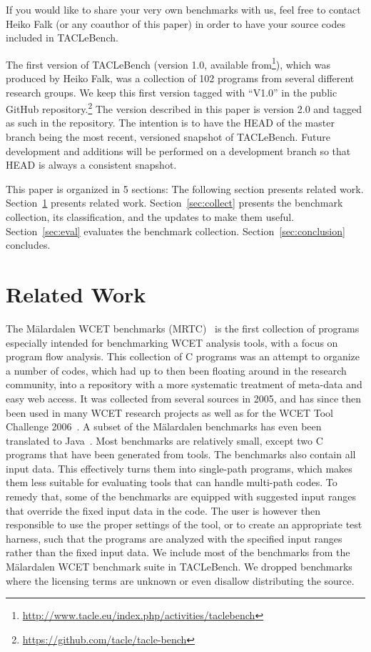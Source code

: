 \documentclass[a4paper,UKenglish]{oasics}
\begin{document}
If you would like to share your very own benchmarks with us,
feel free to contact Heiko Falk (or any coauthor of this paper) in order
to have your source codes included in TACLeBench.

The first version of TACLeBench (version 1.0, available
from\footnote{\url{http://www.tacle.eu/index.php/activities/taclebench}}), which was produced
by Heiko Falk, was a collection of 102 programs from several different
research groups. We keep this first version tagged with ``V1.0'' in the public
GitHub repository.\footnote{\url{https://github.com/tacle/tacle-bench}}
The version described in this paper is version 2.0 and tagged as such in the
repository.
The intention is to have the HEAD of the master branch being
the most recent, versioned snapshot of TACLeBench.
Future development and additions will be performed on a development
branch so that HEAD is always a consistent snapshot.

This paper is organized in 5 sections: The following section presents related work.
Section~\ref{sec:related} presents related work.
Section~\ref{sec:collect} presents the benchmark collection, its classification, and the updates
to make them useful.
Section~\ref{sec:eval} evaluates the benchmark collection.
Section~\ref{sec:conclusion} concludes.

\section{Related Work}
\label{sec:related}

The M{\"a}lardalen WCET benchmarks (MRTC)~\cite{wcet:bench:2012} is the first collection of programs especially
intended for benchmarking WCET analysis tools, with a focus on program flow analysis.
This collection of C programs was an attempt to organize a number of codes, which had up to then been floating around
in the research community, into a repository with a more systematic treatment of meta-data and easy web access.
It was collected from several sources in 2005, and has since then been
used in many WCET research projects as well as for the WCET Tool Challenge 2006~\cite{Gustafsson:ISOLA2006}.
A subset of the M{\"a}lardalen benchmarks has even been translated to
Java~\cite{jop:volta:rtas2008}. Most benchmarks are relatively small, except
two C programs that have been generated from tools.
The benchmarks also contain all input data. This effectively turns them into single-path programs, which
makes them less suitable for evaluating tools that can handle multi-path codes. To remedy that,
some of the benchmarks are equipped with suggested input ranges that override the fixed
input data in the code. The user is however then responsible to use the proper settings of the tool,
or to create an appropriate test harness, such that the programs are analyzed with the specified input ranges
rather than the fixed input data.
We include most of the benchmarks from the
M{\"a}lardalen WCET benchmark suite in TACLeBench.
We dropped benchmarks where the licensing terms are unknown
or even disallow distributing the source.
\end{document}
